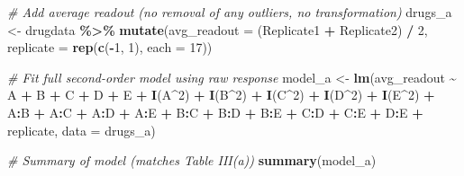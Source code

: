 \documentclass[
]{article}
\newenvironment{Shaded}{\begin{snugshade}}{\end{snugshade}}
\newcommand{\AttributeTok}[1]{\textcolor[rgb]{0.13,0.29,0.53}{#1}}
\newcommand{\CommentTok}[1]{\textcolor[rgb]{0.56,0.35,0.01}{\textit{#1}}}
\newcommand{\DecValTok}[1]{\textcolor[rgb]{0.00,0.00,0.81}{#1}}
\newcommand{\FunctionTok}[1]{\textcolor[rgb]{0.13,0.29,0.53}{\textbf{#1}}}
\newcommand{\NormalTok}[1]{#1}
\newcommand{\OtherTok}[1]{\textcolor[rgb]{0.56,0.35,0.01}{#1}}
\newcommand{\SpecialCharTok}[1]{\textcolor[rgb]{0.81,0.36,0.00}{\textbf{#1}}}
\begin{document}
\begin{Shaded}
\begin{Highlighting}[]
\CommentTok{\# Add average readout (no removal of any outliers, no transformation)}
\NormalTok{drugs\_a }\OtherTok{\textless{}{-}}\NormalTok{ drugdata }\SpecialCharTok{\%\textgreater{}\%}
  \FunctionTok{mutate}\NormalTok{(}\AttributeTok{avg\_readout =}\NormalTok{ (Replicate1 }\SpecialCharTok{+}\NormalTok{ Replicate2) }\SpecialCharTok{/} \DecValTok{2}\NormalTok{,}
         \AttributeTok{replicate =} \FunctionTok{rep}\NormalTok{(}\FunctionTok{c}\NormalTok{(}\SpecialCharTok{{-}}\DecValTok{1}\NormalTok{, }\DecValTok{1}\NormalTok{), }\AttributeTok{each =} \DecValTok{17}\NormalTok{))}

\CommentTok{\# Fit full second{-}order model using raw response}
\NormalTok{model\_a }\OtherTok{\textless{}{-}} \FunctionTok{lm}\NormalTok{(avg\_readout }\SpecialCharTok{\textasciitilde{}}\NormalTok{ A }\SpecialCharTok{+}\NormalTok{ B }\SpecialCharTok{+}\NormalTok{ C }\SpecialCharTok{+}\NormalTok{ D }\SpecialCharTok{+}\NormalTok{ E }\SpecialCharTok{+}
                \FunctionTok{I}\NormalTok{(A}\SpecialCharTok{\^{}}\DecValTok{2}\NormalTok{) }\SpecialCharTok{+} \FunctionTok{I}\NormalTok{(B}\SpecialCharTok{\^{}}\DecValTok{2}\NormalTok{) }\SpecialCharTok{+} \FunctionTok{I}\NormalTok{(C}\SpecialCharTok{\^{}}\DecValTok{2}\NormalTok{) }\SpecialCharTok{+} \FunctionTok{I}\NormalTok{(D}\SpecialCharTok{\^{}}\DecValTok{2}\NormalTok{) }\SpecialCharTok{+} \FunctionTok{I}\NormalTok{(E}\SpecialCharTok{\^{}}\DecValTok{2}\NormalTok{) }\SpecialCharTok{+}
\NormalTok{                A}\SpecialCharTok{:}\NormalTok{B }\SpecialCharTok{+}\NormalTok{ A}\SpecialCharTok{:}\NormalTok{C }\SpecialCharTok{+}\NormalTok{ A}\SpecialCharTok{:}\NormalTok{D }\SpecialCharTok{+}\NormalTok{ A}\SpecialCharTok{:}\NormalTok{E }\SpecialCharTok{+}
\NormalTok{                B}\SpecialCharTok{:}\NormalTok{C }\SpecialCharTok{+}\NormalTok{ B}\SpecialCharTok{:}\NormalTok{D }\SpecialCharTok{+}\NormalTok{ B}\SpecialCharTok{:}\NormalTok{E }\SpecialCharTok{+}
\NormalTok{                C}\SpecialCharTok{:}\NormalTok{D }\SpecialCharTok{+}\NormalTok{ C}\SpecialCharTok{:}\NormalTok{E }\SpecialCharTok{+}\NormalTok{ D}\SpecialCharTok{:}\NormalTok{E }\SpecialCharTok{+}
\NormalTok{                replicate,}
              \AttributeTok{data =}\NormalTok{ drugs\_a)}

\CommentTok{\# Summary of model (matches Table III(a))}
\FunctionTok{summary}\NormalTok{(model\_a)}
\end{Highlighting}
\end{Shaded}
\end{document}
